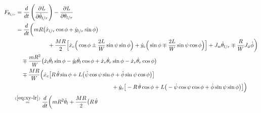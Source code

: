 \documentclass[a4paper]{article}
\newcommand{\pitch}{\psi}
\newcommand{\yaw}{\phi}
\newcommand{\roll}{\theta}
\begin{document}
\begin{equation} \begin{split}
    F_{\roll_{l/r}}
    &= \frac{d}{dt} \left( \frac{\partial L}{\partial \dot\roll_{l/r}} \right)
     - \frac{\partial L}{\partial \roll_{l/r}}
    \\
    &= \frac{d}{dt} \bigg( m R \big( \dot{x}_{l/r} \cos\yaw
                                   + \dot{y}_{l/r} \sin\yaw
                               \big)
    \\ &\hspace{2cm}
                         + \frac{M R}{2}
                           \Big[ \dot{x}_c
                                 \Big( \cos\yaw
                                   \pm \frac{2 L}{W} \sin\pitch \sin\yaw
                                 \Big)
                               + \dot{y}_c
                                 \Big( \sin\yaw
                                   \mp \frac{2 L}{W} \sin\pitch \cos\yaw
                                 \Big)
                           \Big]
                          + J_w \dot\roll_{l/r}
                          \mp \frac{R}{W} J_\yaw \dot\yaw
                      \bigg)
    \\ &\quad \mp \frac{m R^2}{W} \big( \dot{x}_l \dot\roll_l \sin\yaw
                                      - \dot{y}_l \dot\roll_l \cos\yaw
                                      + \dot{x}_r \dot\roll_r \sin\yaw
                                      - \dot{x}_r \dot\roll_r \cos\yaw
                                \big)
    \\ &\quad \mp \frac{M R}{W}
                  \Big( \dot{x}_c \big[ R \, \dot\roll \sin\yaw
                                      + L \big( \dot\pitch \cos\pitch \sin\yaw
                                              + \dot\yaw \sin\pitch \cos\yaw
                                          \big)
                                  \big]
    \\ &\hspace{6cm}
                      + \dot{y}_c \big[ - R \, \dot\roll \cos\yaw
                                      + L \big( -\dot\pitch \cos\pitch \cos\yaw
                                              + \dot\yaw \sin\pitch \sin\yaw        
                                          \big)
                                  \big]
                  \Big)
    \\
    &\hspace{-1.5mm} \stackrel{(\ref{eq:xy-lr})}{=}
        \frac{d}{dt} \bigg( m R^2 \dot\roll_l
                          + \frac{M R}{2} \big( R \, \dot\roll

\end{split}
\end{equation}
\end{document}
